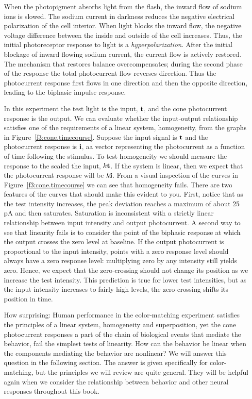 When the photopigment absorbs light from the flash, the inward
flow of sodium ions is slowed.
The sodium current in darkness reduces the negative
electrical polarization of the cell interior.
When light blocks the inward flow,
the negative voltage difference between the inside and outside
of the cell increases.
Thus, the initial photoreceptor response
to light is a {\em hyperpolarization}.
After the initial blockage of inward
flowing sodium current,
the current flow is actively restored.
The mechanism that restores balance overcompensates;
during the second phase of the response
the total photocurrent flow reverses direction.
Thus the photocurrent response first flows in one
direction and then the opposite direction,
leading to the biphasic impulse response.

In this experiment the test light is the input, $\mbox{${\bf t}$}$,
and the cone photocurrent response is the output.
We can evaluate whether the input-output
relationship satisfies one of the requirements of a linear
system, homogeneity,
from the graphs in Figure~\ref{f3:cone.timecourse}.
Suppose the input signal is $\mbox{${\bf t}$}$
and the photocurrent response is $\mbox{\bf i}$,
aa vector representing the photocurrent as a function
of time following the stimulus.
To test homogeneity we should measure the
response to the scaled the input, $k \mbox{${\bf t}$}$.
If the system is linear, then we
expect that the photocurrent response will be
$k \mbox{\bf i}$.
From a visual inspection of the curves
in Figure~\ref{f3:cone.timecourse} we can see that
homogeneity fails.
There are two features of the curves
that should make this evident to you.
First, notice that as the test intensity increases, 
the peak deviation reaches a maximum of about 25 pA 
and then saturates.
Saturation is inconsistent with a strictly linear relationship
between input intensity and output photocurrent.
A second way to see that linearity fails is to consider
the point of the biphasic response at which the output
crosses the zero level at baseline.
If the output photocurrent is proportional to the input intensity,
points with a zero response level should always have a zero response level:
multiplying zero by any intensity still yields zero.
Hence, we expect that the zero-crossing
should not change its position as we increase the test intensity.
This prediction is true for lower test intensities,
but as the input intensity increases to fairly high levels,
the zero-crossing shifts its position in time.

How surprising: Human performance in the color-matching experiment
satisfies the principles of a linear system, homogeneity and
superposition,
yet the cone photocurrent responses a part
of the chain of biological events that
mediate the behavior, fail the simplest tests of linearity.
How can the behavior be linear when the components mediating
the behavior are nonlinear?
We will answer this question in the following section.
The answer is given specifically
for color-matching, but
the principles we will review are quite general.
They will be helpful again when we consider
the relationship between behavior and other neural responses
throughout this book.

